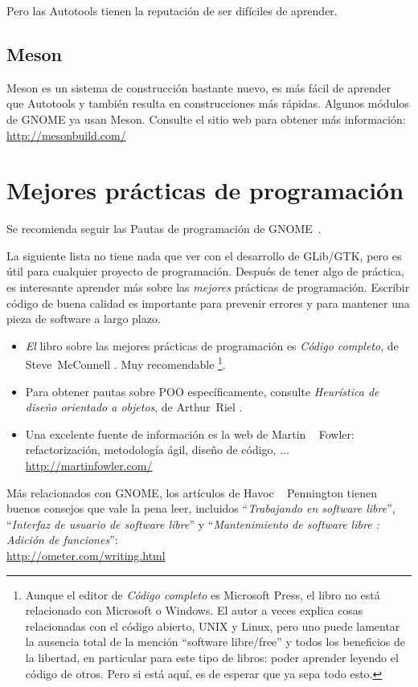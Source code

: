 Pero las Autotools tienen la reputación de ser difíciles de aprender.

\subsection{Meson}

Meson es un sistema de construcción bastante nuevo, es más fácil de aprender que Autotools y también resulta en construcciones más rápidas. Algunos módulos de GNOME ya usan Meson. Consulte el sitio web para obtener más información:\\
\url{http://mesonbuild.com/}

\section{Mejores prácticas de programación}

Se recomienda seguir las Pautas de programación de GNOME~\cite{gnome-programming-guidelines}.

La siguiente lista no tiene nada que ver con el desarrollo de GLib/GTK, pero es útil para cualquier proyecto de programación. Después de tener algo de práctica, es interesante aprender más sobre las \emph{mejores} prácticas de programación. Escribir código de buena calidad es importante para prevenir errores y para mantener una pieza de software a largo plazo.

\begin{itemize}
  \item \emph{El} libro sobre las mejores prácticas de programación es \emph{Código completo}, de Steve~McConnell \cite{code-complete}. Muy recomendable \footnote{Aunque el editor de \emph{Código completo} es Microsoft Press, el libro no está relacionado con Microsoft o Windows. El autor a veces explica cosas relacionadas con el código abierto, UNIX y Linux, pero uno puede lamentar la ausencia total de la mención ``software libre/free'' y todos los beneficios de la libertad, en particular para este tipo de libros: poder aprender leyendo el código de otros. Pero si está aquí, es de esperar que ya sepa todo esto.}.

  \item Para obtener pautas sobre POO específicamente, consulte \emph{Heurística de diseño orientado a objetos}, de Arthur~Riel \cite{oop-book}.

  \item Una excelente fuente de información es la web de Martin ~ Fowler: refactorización, metodología ágil, diseño de código, ...\\
  \url{http://martinfowler.com/}
\end{itemize}

Más relacionados con GNOME, los artículos de Havoc ~ Pennington tienen buenos consejos que vale la pena leer, incluidos ``\emph{Trabajando en software libre}'', ``\emph{Interfaz de usuario de software libre}'' y ``\emph{Mantenimiento de software libre : Adición de funciones}'':\\
\url{http://ometer.com/writing.html}